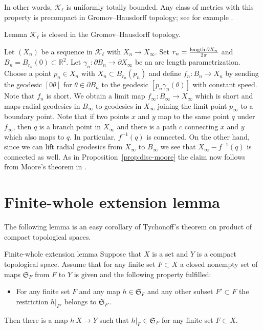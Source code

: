 \documentclass{article}
\begin{document}
In other words, $\mathcal{K}_\ell$ is uniformly totally bounded.
Any class of metrics with this property is precompact in Gromov--Hausdorff topology; 
see for example \cite[7.4.15]{BBI}.
\qeds





\begin{thm}{Lemma}\label{lem:closed}
$\mathcal{K}_\ell$ is closed in the Gromov--Hausdorff topology.
\end{thm}

Let $(X_n)$ be a sequence in $\mathcal{K}_\ell$ with $X_n\to X_\infty$. 
Set $r_n=\frac{\mathop{\rm length}\nolimits\partial X_n}{2\pi}$ 
and $B_n=B_{r_n}(0)\subset \mathbb{R}^2$.
Let $\gamma_n:\partial B_n\to\partial X_\infty$ be an arc length parametrization.
Choose a point $p_n\in X_n$ with $X_n\subset B_{r_n}(p_n)$ and define
$f_n:B_n\to X_n$ by sending the geodesic $[0\theta]$ for $\theta\in\partial B_n$ to the geodesic $[p_n\gamma_n(\theta)]$ with constant speed. 
Note that $f_n$ is short.
We obtain a limit map $f_\infty:B_\infty\to X_\infty$ which is short and maps radial geodesics in $B_\infty$ to geodesics in $X_\infty$ joining the limit point $p_\infty$
to a boundary point.
Note that if two points $x$  and $y$ map to the same point $q$ under $f_\infty$, then $q$ is a branch point in $X_\infty$ and there is a path $c$ connecting 
$x$ and $y$ which also maps to $q$. 
In particular, $f^{-1}(q)$ is connected.
On the other hand, since we can lift radial geodesics from $X_\infty$ to $B_\infty$ we see that $X_\infty-f^{-1}(q)$
is connected as well.
As in Proposition~\ref{prop:disc-moore} the claim now follows from Moore's theorem in \cite{moore}.
\qeds


\section{Finite-whole extension lemma}\label{Finite-whole extension lemma}

The following lemma is an easy corollary of Tychonoff's theorem on product of compact topological spaces.

\begin{thm}{Finite-whole extension lemma}\label{lem:finite-whole}
Suppose that $X$ is a set 
and $Y$ is a compact topological space.
Assume that for any finite set $F\subset X$ 
a closed nonempty set of maps $\mathfrak{S}_F$ from $F$ to $Y$ is given and the following property fulfilled:
\begin{itemize}
\item For any finite set $F$ and any map $h\in \mathfrak{S}_F$
and any other subset $F'\subset F$
the restriction $h|_{F'}$ belongs to $\mathfrak{S}_{F'}$. 
\end{itemize}

Then there is a map $h\: X\to Y$ such that $h|_F\in \mathfrak{S}_F$ for any finite set $F\subset X$.
\end{thm}
\end{document}
